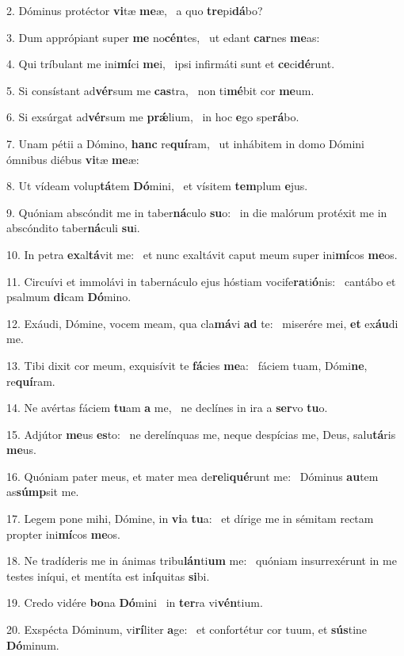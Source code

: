2. Dóminus protéctor \textbf{vi}tæ \textbf{me}æ, \ast\  a quo \textbf{tre}pi\textbf{dá}bo?\

3. Dum apprópiant super \textbf{me} no\textbf{cén}tes, \ast\  ut edant \textbf{car}nes \textbf{me}as:\

4. Qui tríbulant me ini\textbf{mí}ci \textbf{me}i, \ast\  ipsi infirmáti sunt et \textbf{ce}ci\textbf{dé}runt.\

5. Si consístant ad\textbf{vér}sum me \textbf{cas}tra, \ast\  non ti\textbf{mé}bit cor \textbf{me}um.\

6. Si exsúrgat ad\textbf{vér}sum me \textbf{prǽ}lium, \ast\  in hoc \textbf{e}go spe\textbf{rá}bo.\

7. Unam pétii a Dómino, \textbf{hanc} re\textbf{quí}ram, \ast\  ut inhábitem in domo Dómini ómnibus diébus \textbf{vi}tæ \textbf{me}æ:\

8. Ut vídeam volup\textbf{tá}tem \textbf{Dó}mini, \ast\  et vísitem \textbf{tem}plum \textbf{e}jus.\

9. Quóniam abscóndit me in taber\textbf{ná}culo \textbf{su}o: \ast\  in die malórum protéxit me in abscóndito taber\textbf{ná}culi \textbf{su}i.\

10. In petra \textbf{ex}al\textbf{tá}vit me: \ast\  et nunc exaltávit caput meum super ini\textbf{mí}cos \textbf{me}os.\

11. Circuívi et immolávi in tabernáculo ejus hóstiam vocife\textbf{ra}ti\textbf{ó}nis: \ast\  cantábo et psalmum \textbf{di}cam \textbf{Dó}mino.\

12. Exáudi, Dómine, vocem meam, qua cla\textbf{má}vi \textbf{ad} te: \ast\  miserére mei, \textbf{et} ex\textbf{áu}di me.\

13. Tibi dixit cor meum, exquisívit te \textbf{fá}cies \textbf{me}a: \ast\  fáciem tuam, Dómi\textbf{ne}, re\textbf{quí}ram.\

14. Ne avértas fáciem \textbf{tu}am \textbf{a} me, \ast\  ne declínes in ira a \textbf{ser}vo \textbf{tu}o.\

15. Adjútor \textbf{me}us \textbf{es}to: \ast\  ne derelínquas me, neque despícias me, Deus, salu\textbf{tá}ris \textbf{me}us.\

16. Quóniam pater meus, et mater mea de\textbf{re}li\textbf{qué}runt me: \ast\  Dóminus \textbf{au}tem as\textbf{súmp}sit me.\

17. Legem pone mihi, Dómine, in \textbf{vi}a \textbf{tu}a: \ast\  et dírige me in sémitam rectam propter ini\textbf{mí}cos \textbf{me}os.\

18. Ne tradíderis me in ánimas tribu\textbf{lán}ti\textbf{um} me: \ast\  quóniam insurrexérunt in me testes iníqui, et mentíta est in\textbf{í}quitas \textbf{si}bi.\

19. Credo vidére \textbf{bo}na \textbf{Dó}mini \ast\  in \textbf{ter}ra vi\textbf{vén}tium.\

20. Exspécta Dóminum, vi\textbf{rí}liter \textbf{a}ge: \ast\  et confortétur cor tuum, et \textbf{sús}tine \textbf{Dó}minum.\

